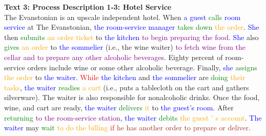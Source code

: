 \textbf{Text 3: Process Description 1-3: Hotel Service}\\
The Evanstonian is an upscale independent hotel. When \textcolor{blue}{a} \textcolor{blue}{guest} \textcolor{green}{calls} \textcolor{blue}{room} \textcolor{blue}{service} at The Evanstonian, \textcolor{blue}{the} \textcolor{blue}{room-service} \textcolor{blue}{manager} \textcolor{green}{takes} \textcolor{green}{down} \textcolor{orange}{the} \textcolor{orange}{order}. \textcolor{blue}{She} then \textcolor{green}{submits} \textcolor{orange}{an} \textcolor{orange}{order} \textcolor{orange}{ticket} to \textcolor{blue}{the} \textcolor{blue}{kitchen} \textcolor{purple}{to} \textcolor{purple}{begin} \textcolor{purple}{preparing} \textcolor{purple}{the} \textcolor{purple}{food}. \textcolor{blue}{She} also \textcolor{green}{gives} \textcolor{orange}{an} \textcolor{orange}{order} to \textcolor{blue}{the} \textcolor{blue}{sommelier} (i.e., the wine waiter) \textcolor{purple}{to} \textcolor{purple}{fetch} \textcolor{purple}{wine} \textcolor{purple}{from} \textcolor{purple}{the} \textcolor{purple}{cellar} \textcolor{purple}{and} \textcolor{purple}{to} \textcolor{purple}{prepare} \textcolor{purple}{any} \textcolor{purple}{other} \textcolor{purple}{alcoholic} \textcolor{purple}{beverages}. Eighty percent of room-service orders include wine or some other alcoholic beverage. Finally, \textcolor{blue}{she} \textcolor{green}{assigns} \textcolor{orange}{the} \textcolor{orange}{order} to \textcolor{blue}{the} \textcolor{blue}{waiter}. \textcolor{red}{While} \textcolor{blue}{the} \textcolor{blue}{kitchen} and \textcolor{blue}{the} \textcolor{blue}{sommelier} are \textcolor{green}{doing} \textcolor{orange}{their} \textcolor{orange}{tasks}, \textcolor{blue}{the} \textcolor{blue}{waiter} \textcolor{green}{readies} \textcolor{orange}{a} \textcolor{orange}{cart} (i.e., puts a tablecloth on the cart and gathers silverware). The waiter is also responsible for nonalcoholic drinks. Once the food, wine, and cart are ready, \textcolor{blue}{the} \textcolor{blue}{waiter} \textcolor{green}{delivers} \textcolor{orange}{it} to \textcolor{blue}{the} \textcolor{blue}{guest’s} \textcolor{blue}{room}. After \textcolor{green}{returning} \textcolor{purple}{to} \textcolor{purple}{the} \textcolor{purple}{room-service} \textcolor{purple}{station}, \textcolor{blue}{the} \textcolor{blue}{waiter} \textcolor{green}{debits} \textcolor{orange}{the} \textcolor{orange}{guest} \textcolor{orange}{’} \textcolor{orange}{s} \textcolor{orange}{account}. \textcolor{blue}{The} \textcolor{blue}{waiter} may \textcolor{green}{wait} \textcolor{orange}{to} \textcolor{orange}{do} \textcolor{orange}{the} \textcolor{orange}{billing} \textcolor{red}{if} \textcolor{brown}{he} \textcolor{brown}{has} \textcolor{brown}{another} \textcolor{brown}{order} \textcolor{brown}{to} \textcolor{brown}{prepare} \textcolor{brown}{or} \textcolor{brown}{deliver}.

